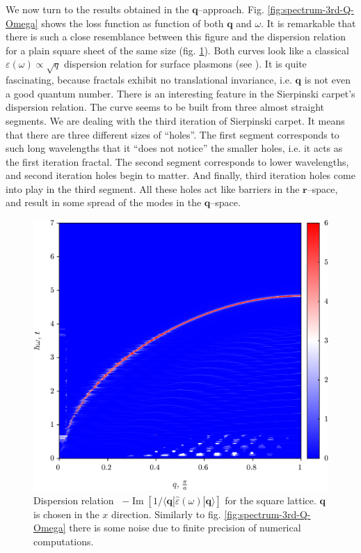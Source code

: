 \documentclass[a4paper,12pt]{article}
\begin{document}
    We now turn to the results obtained in the $\mathbf{q}$--approach. Fig. \ref{fig:spectrum-3rd-Q-Omega} shows the loss function as function of both $\mathbf{q}$ and $\omega$. It is remarkable that there is such a close resemblance between this figure and the dispersion relation for a plain square sheet of the same size (fig. \ref{fig:spectrum-SL-Q-Omega}). Both curves look like a classical $\varepsilon(\omega) \propto \sqrt{q}$ dispersion relation for surface plasmons (see \cite{giuliani2005quantum}). It is quite fascinating, because fractals exhibit no translational invariance, i.e. $\mathbf{q}$ is not even a good quantum number. There is an interesting feature in the Sierpinski carpet's dispersion relation. The curve seems to be built from three almost straight segments. We are dealing with the third iteration of Sierpinski carpet. It means that there are three different sizes of ``holes''. The first segment corresponds to such long wavelengths that it ``does not notice'' the smaller holes, i.e. it acts as the first iteration fractal. The second segment corresponds to lower wavelengths, and second iteration holes begin to matter. And finally, third iteration holes come into play in the third segment. All these holes act like barriers in the $\mathbf{r}$--space, and result in some spread of the modes in the $\mathbf{q}$--space.

    \begin{figure}[h]
    \center
    \includegraphics[width=\textwidth]{Spectrum-SL-Q-Omega.png}
    \caption{Dispersion relation \ $-\operatorname{Im}[1 / \langle\mathbf{q}| \hat\varepsilon(\omega) |\mathbf{q}\rangle]$ for the square lattice. $\mathbf{q}$ is chosen in the $x$ direction. Similarly to fig. \ref{fig:spectrum-3rd-Q-Omega} there is some noise due to finite precision of numerical computations.}
    \label{fig:spectrum-SL-Q-Omega}
    \end{figure}
\end{document}

